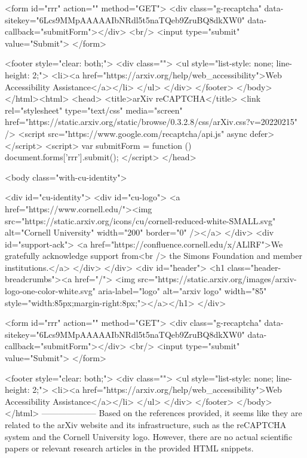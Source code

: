        <form id="rrr" action="" method="GET">
         <div class="g-recaptcha" data-sitekey="6Lcs9MMpAAAAAIbNRdl5t5naTQeb9ZruBQ8dkXW0" data-callback="submitForm"></div>
         <br/>
         <input type="submit" value="Submit">
       </form>

       <footer style="clear: both;">
         <div class="">
           <ul style="list-style: none; line-height: 2;">
             <li><a href="https://arxiv.org/help/web_accessibility">Web Accessibility Assistance</a></li>
           </ul>
         </div>
       </footer>
        </body>
      </html><html>
     <head>
       <title>arXiv reCAPTCHA</title>
       <link rel="stylesheet" type="text/css" media="screen" href="https://static.arxiv.org/static/browse/0.3.2.8/css/arXiv.css?v=20220215" />
       <script src="https://www.google.com/recaptcha/api.js" async defer></script>
       <script>
         var submitForm = function () {
             document.forms['rrr'].submit();
         }
       </script>
     </head>

     <body class="with-cu-identity">

       <div id="cu-identity">
         <div id="cu-logo">
           <a href="https://www.cornell.edu/"><img src="https://static.arxiv.org/icons/cu/cornell-reduced-white-SMALL.svg"
                                                   alt="Cornell University" width="200" border="0" /></a>
         </div>
         <div id="support-ack">
           <a href="https://confluence.cornell.edu/x/ALlRF">We gratefully acknowledge support from<br />
             the Simons Foundation and member institutions.</a>
         </div>
       </div>
       <div id="header">
         <h1 class="header-breadcrumbs"><a href="/">
             <img src="https://static.arxiv.org/images/arxiv-logo-one-color-white.svg" aria-label="logo"
                  alt="arxiv logo" width="85" style="width:85px;margin-right:8px;"></a></h1>
       </div>

       <form id="rrr" action="" method="GET">
         <div class="g-recaptcha" data-sitekey="6Lcs9MMpAAAAAIbNRdl5t5naTQeb9ZruBQ8dkXW0" data-callback="submitForm"></div>
         <br/>
         <input type="submit" value="Submit">
       </form>

       <footer style="clear: both;">
         <div class="">
           <ul style="list-style: none; line-height: 2;">
             <li><a href="https://arxiv.org/help/web_accessibility">Web Accessibility Assistance</a></li>
           </ul>
         </div>
       </footer>
        </body>
      </html>
        --------------------
         Based on the references provided, it seems like they are related to the arXiv website and its infrastructure, such as the reCAPTCHA system and the Cornell University logo. However, there are no actual scientific papers or relevant research articles in the provided HTML snippets.

